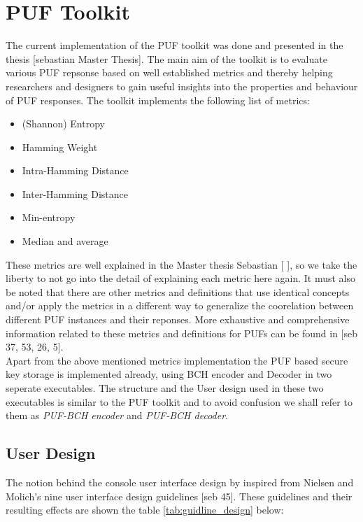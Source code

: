 \section{PUF Toolkit}
The current implementation of the PUF toolkit was done and presented in the thesis [sebastian Master Thesis]. The main aim of the toolkit is to evaluate various PUF repsonse based on well established metrics and thereby helping researchers and designers to gain useful insights into the properties and behaviour of PUF responses. The toolkit implements the following list of metrics: \pagebreak

\begin{itemize}
	\item (Shannon) Entropy
	\item Hamming Weight
	\item Intra-Hamming Distance
	\item Inter-Hamming Distance
	\item Min-entropy
	\item Median and average
\end{itemize}

These metrics are well explained in the Master thesis Sebastian [ ], so we take the liberty to not go into the detail of explaining each metric here again. It must also be noted that there are other metrics and definitions that use identical concepts and/or apply the metrics in a different way to generalize the coorelation between different PUF instances and their reponses. More exhaustive and comprehensive information related to these metrics and definitions for PUFs can be found in [seb 37, 53, 26, 5].\\

Apart from the above mentioned metrics implementation the PUF based secure key storage is implemented already, using BCH encoder and Decoder in two seperate executables. The structure and the User design used in these two executables is similar to the PUF toolkit and to avoid confusion we shall refer to them as \emph{PUF-BCH encoder} and \emph{PUF-BCH decoder}.\\

\subsection{User Design}

The notion behind the console user interface design by inspired from Nielsen and Molich's nine user interface design guidelines [seb 45]. These guidelines and their resulting effects are shown the table \ref{tab:guidline_design} below:

